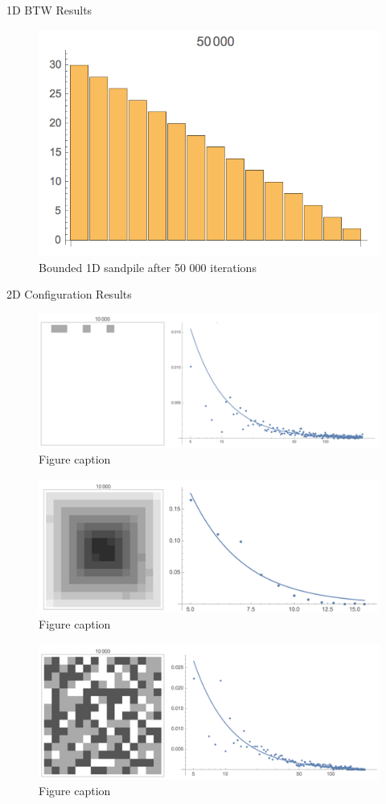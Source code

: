 \documentclass[final]{beamer}
\newlength{\onecolwid}
\begin{document}
\begin{frame}[t]
\begin{columns}[t]
\begin{column}{\onecolwid}
\begin{block}{1D BTW Results}
\begin{figure}
\includegraphics[width=0.4\linewidth]{1D.jpg}
\caption{Bounded 1D sandpile after 50 000 iterations}
\end{figure}
\end{block}



\begin{block}{2D Configuration Results}

\begin{figure}
\includegraphics[width=0.8\linewidth]{2D-btw.jpg}
\caption{Figure caption}
\end{figure}

\begin{figure}
\includegraphics[width=0.8\linewidth]{2D-sloped.jpg}
\caption{Figure caption}
\end{figure}

\begin{figure}
\includegraphics[width=0.8\linewidth]{2D-indep.jpg}
\caption{Figure caption}
\end{figure}


\end{block}
\end{column}
\end{columns}
\end{frame}
\end{document}
